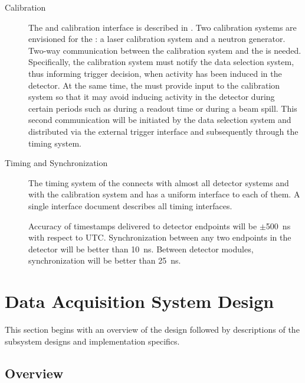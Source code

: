 \begin{description}
\item[Calibration] The  and calibration interface is described in . Two calibration systems are envisioned for the : a laser calibration system and a neutron generator. 
  Two-way communication between the calibration system and the
   is needed.  Specifically, the calibration system must
  notify the data selection system, thus informing trigger decision,
  when activity has been induced in the detector. At the same time, the  must provide input to the calibration system so that it may avoid inducing activity in the detector during certain periods such as during a  readout time or during a beam spill.
This second communication will be initiated by the data selection
system and distributed via the external trigger interface and
subsequently through the
 timing system.


\item[Timing and Synchronization] The timing system of the   connects with almost all detector systems and with the calibration system and has a uniform interface to each of them. 
  A single interface document  describes all timing interfaces. 

Accuracy of timestamps delivered to  detector endpoints will be $\pm$\SI{500}{\nano\second} with respect to UTC. Synchronization between any two endpoints in the detector will be better than \SI{10}{\nano\second}. Between detector modules, synchronization will be better than \SI{25}{\nano\second}.  
\end{description}

\section{Data Acquisition System Design}
\label{sec:fd-daq:design}

This section begins with an overview of the 
design followed by
descriptions of the subsystem designs and implementation specifics.

\subsection{Overview}
\label{sec:fd-daq:design-overview}

